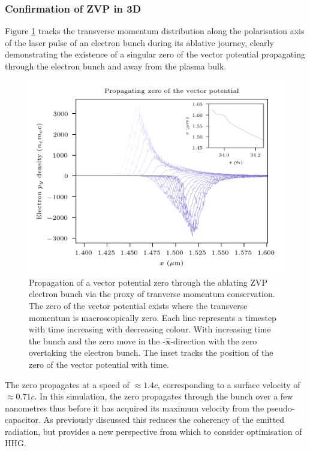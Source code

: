 \subsubsection{Confirmation of ZVP in 3D}
Figure \ref{fig:zvppropagatingzero} tracks the transverse momentum distribution along the polarisation axis of the laser pulse of an electron bunch during its ablative journey, clearly demonstrating the existence of a singular zero of the vector potential propagating through the electron bunch and away from the plasma bulk.
\begin{figure}
	\centering
	\includegraphics[width=0.7\linewidth]{figures/zvp/zvp_propagating_zero}
	\caption[Propagation of a vector potential zero through the ablating ZVP electron bunch.]{Propagation of a vector potential zero through the ablating ZVP electron bunch via the proxy of tranverse momentum conservation. The zero of the vector potential exists where the transverse momentum is macroscopically zero. Each line represents a timestep with time increasing with decreasing colour. With increasing time the bunch and the zero move in the -$\hat{\mathbf{x}}$-direction with the zero overtaking the electron bunch. The inset tracks the position of the zero of the vector potential with time.}
	\label{fig:zvppropagatingzero}
\end{figure}
The zero propagates at a speed of $\approx 1.4c$, corresponding to a surface velocity of $\approx 0.71c$. In this simulation, the zero propagates through the bunch over a few nanometres thus before it has acquired its maximum velocity from the pseudo-capacitor. As previously discussed this reduces the coherency of the emitted radiation, but provides a new perspective from which to consider optimisation of HHG.

